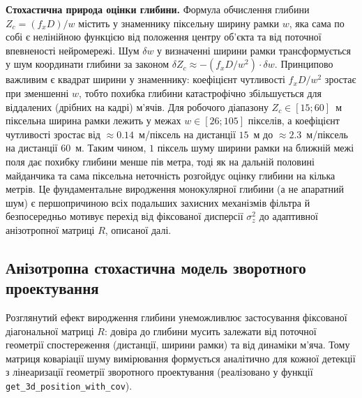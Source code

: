 \textbf{Стохастична природа оцінки глибини.} Формула обчислення глибини
$Z_c = (f_x D) / w$ містить у знаменнику піксельну ширину рамки $w$, яка сама по
собі є нелінійною функцією від положення центру об'єкта та від поточної
впевненості нейромережі. Шум $\delta w$ у визначенні ширини рамки трансформується
у шум координати глибини за законом
$\delta Z_c \approx -(f_x D / w^2) \cdot \delta w$. Принципово важливим є квадрат
ширини у знаменнику: коефіцієнт чутливості $f_x D / w^2$ зростає при зменшенні
$w$, тобто похибка глибини катастрофічно збільшується для віддалених (дрібних на
кадрі) м'ячів. Для робочого діапазону $Z_c \in [15; 60]$~м піксельна ширина рамки
лежить у межах $w \in [26; 105]$ пікселів, а коефіцієнт чутливості зростає від
$\approx 0.14$~м/піксель на дистанції $15$~м до $\approx 2.3$~м/піксель на
дистанції $60$~м. Таким чином, $1$ піксель шуму ширини рамки на ближній межі поля
дає похибку глибини менше пів метра, тоді як на дальній половині майданчика та
сама піксельна неточність розгойдує оцінку глибини на кілька метрів. Це
фундаментальне виродження монокулярної глибини (а не апаратний шум) є
першопричиною всіх подальших захисних механізмів фільтра й безпосередньо мотивує
перехід від фіксованої дисперсії $\sigma_z^2$ до адаптивної анізотропної матриці
$R$, описаної далі.

\subsection{Анізотропна стохастична модель зворотного проектування}

Розглянутий ефект виродження глибини унеможливлює застосування фіксованої
діагональної матриці $R$: довіра до глибини мусить залежати від поточної
геометрії спостереження (дистанції, ширини рамки) та від динаміки м'яча. Тому
матриця коваріації шуму вимірювання формується аналітично для кожної детекції з
лінеаризації геометрії зворотного проектування (реалізовано у функції
\texttt{get\_3d\_position\_with\_cov}).

